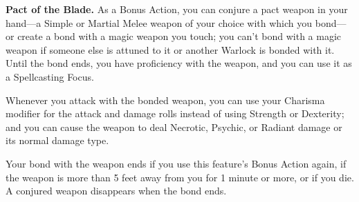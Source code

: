 \textbf{Pact of the Blade.} As a Bonus Action, you can conjure a pact weapon in your hand---a Simple or Martial Melee weapon of your choice with which you bond---or create a bond with a magic weapon you touch; you can't bond with a magic weapon if someone else is attuned to it or another Warlock is bonded with it. Until the bond ends, you have proficiency with the weapon, and you can use it as a Spellcasting Focus.

Whenever you attack with the bonded weapon, you can use your Charisma modifier for the attack and damage rolls instead of using Strength or Dexterity; and you can cause the weapon to deal Necrotic, Psychic, or Radiant damage or its normal damage type.

Your bond with the weapon ends if you use this feature's Bonus Action again, if the weapon is more than 5 feet away from you for 1 minute or more, or if you die. A conjured weapon disappears when the bond ends.
